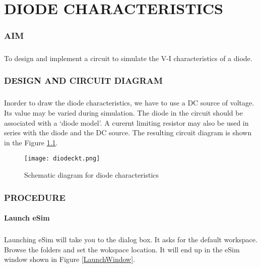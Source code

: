 \chapter{DIODE CHARACTERISTICS}

\subsection*{AIM}
\paragraph{}To design and implement a circuit to simulate the V-I characteristics of a diode.

\subsection*{DESIGN AND CIRCUIT DIAGRAM}
\paragraph{}

Inorder to draw the diode characteristics, we have to use a DC source of voltage. Its value may be varied during simulation. The diode in the circuit should be associated with a `diode model'. A curernt limiting resistor may also be used in series with the diode and the DC source. The resulting circuit diagram is shown in the Figure \ref{diodeckt}.
\begin{figure}[H]
\centering
\texttt{[image: diodeckt.png]}
\caption{Schematic diagram for diode characteristics}
\label{diodeckt}
\end{figure}

\subsection*{PROCEDURE}

\subsubsection{Launch eSim}

\paragraph{}
 Launching eSim will take you to the dialog box. It asks for the default workspace. Browse the folders and set the wokspace location. It will end up in the eSim window shown in Figure \ref{LaunchWindow}.
 
